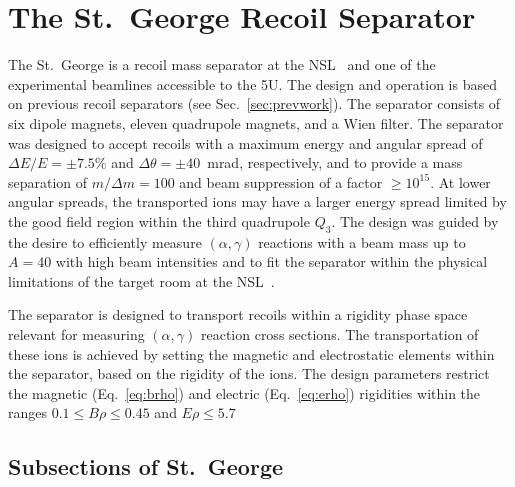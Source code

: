 \section{The St.\ George Recoil Separator}
\label{sec:stg}

The St.\ George is a recoil mass separator at the NSL~\cite{Couder2008}
and one of the experimental beamlines accessible to the 5U. The design
and operation is based on previous recoil separators (see
Sec.~\ref{sec:prevwork}). The separator consists of six dipole magnets,
eleven quadrupole magnets, and a Wien filter. The separator was designed
to accept recoils with a maximum energy and angular spread of $\Delta
E/E = \pm7.5\%$ and $\Delta\theta = \pm40$~mrad, respectively, and to
provide a mass separation of $m/\Delta m = 100$ and beam suppression of
a factor $\geq 10^{15}$. At lower angular spreads, the transported ions
may have a larger energy spread limited by the good field region within
the third quadrupole $Q_3$. The design was guided by the desire to
efficiently measure $(\alpha,\gamma)$ reactions with a beam mass up to
$A = 40$ with high beam intensities and to fit the separator within the
physical limitations of the target room at the NSL~\cite{Couder2008}.

The separator is designed to transport recoils within a rigidity phase
space relevant for measuring $(\alpha,\gamma)$ reaction cross sections.
The transportation of these ions is achieved by setting the magnetic and
electrostatic elements within the separator, based on the rigidity of
the ions. The design parameters restrict the magnetic
(Eq.~\ref{eq:brho}) and electric (Eq.~\ref{eq:erho}) rigidities within
the ranges $0.1 \leq B\rho \leq 0.45$ and $E\rho \leq
5.7$~\cite{Couder2008}

\subsection{Subsections of St.\ George}


